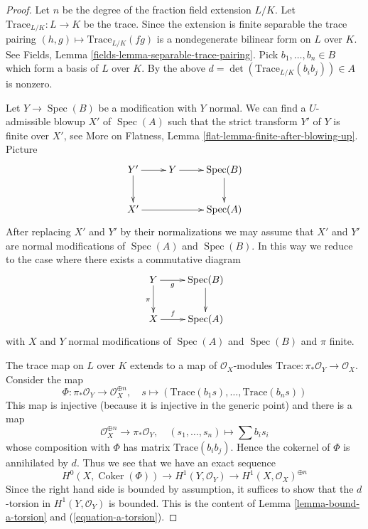 \documentclass[10pt,a4paper]{amsart}
\theoremstyle{plain}
\theoremstyle{definition}
\theoremstyle{remark}
\numberwithin{equation}{subsection}
\def\Spec{\mathop{\mathrm{Spec}}}
\def\Coker{\mathop{\mathrm{Coker}}}
\begin{document}
\begin{proof}
Let $n$ be the degree of the fraction field extension $L/K$.
Let $\text{Trace}_{L/K} : L \to K$ be the trace. Since the extension is finite
separable the trace pairing $(h, g) \mapsto \text{Trace}_{L/K}(fg)$
is a nondegenerate bilinear form on $L$ over $K$. See
Fields, Lemma \ref{fields-lemma-separable-trace-pairing}.
Pick $b_1, \ldots, b_n \in B$ which form a basis of $L$ over $K$.
By the above $d = \det(\text{Trace}_{L/K}(b_ib_j)) \in A$ is nonzero.

\medskip\noindent
Let $Y \to \Spec(B)$ be a modification with $Y$ normal. We can find
a $U$-admissible blowup $X'$ of $\Spec(A)$ such that the strict transform
$Y'$ of $Y$ is finite over $X'$, see More on Flatness, Lemma
\ref{flat-lemma-finite-after-blowing-up}. Picture
$$
\xymatrix{
Y' \ar[d] \ar[r] & Y \ar[r] & \Spec(B) \ar[d] \\
X' \ar[rr] & & \Spec(A)
}
$$
After replacing $X'$ and $Y'$ by their normalizations we may assume that
$X'$ and $Y'$ are normal modifications of $\Spec(A)$ and $\Spec(B)$.
In this way we reduce to the case where there exists a commutative diagram
$$
\xymatrix{
Y \ar[d]_\pi \ar[r]_-g & \Spec(B) \ar[d] \\
X \ar[r]^-f & \Spec(A)
}
$$
with $X$ and $Y$ normal modifications of $\Spec(A)$ and $\Spec(B)$ and
$\pi$ finite.

\medskip\noindent
The trace map on $L$ over $K$ extends to a map of $\mathcal{O}_X$-modules
$\text{Trace} : \pi_*\mathcal{O}_Y \to \mathcal{O}_X$. Consider the map
$$
\Phi : \pi_*\mathcal{O}_Y \longrightarrow \mathcal{O}_X^{\oplus n},\quad
s \longmapsto (\text{Trace}(b_1s), \ldots, \text{Trace}(b_ns))
$$
This map is injective (because it is injective in the generic point)
and there is a map
$$
\mathcal{O}_X^{\oplus n} \longrightarrow \pi_*\mathcal{O}_Y,\quad
(s_1, \ldots, s_n) \longmapsto \sum b_i s_i
$$
whose composition with $\Phi$ has matrix $\text{Trace}(b_ib_j)$.
Hence the cokernel of $\Phi$ is annihilated by $d$. Thus we see that
we have an exact sequence
$$
H^0(X, \Coker(\Phi)) \to H^1(Y, \mathcal{O}_Y) \to
H^1(X, \mathcal{O}_X)^{\oplus n}
$$
Since the right hand side is bounded by assumption, it suffices to show
that the $d$-torsion in $H^1(Y, \mathcal{O}_Y)$ is bounded.
This is the content of Lemma \ref{lemma-bound-a-torsion} and
(\ref{equation-a-torsion}).
\end{proof}
\end{document}
